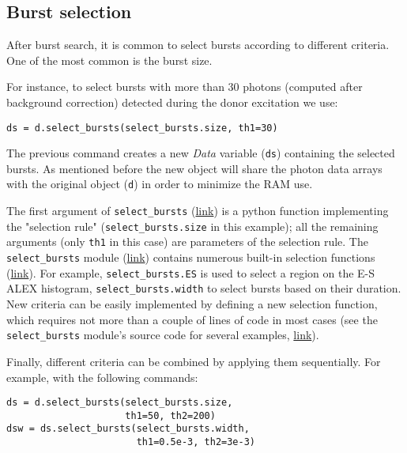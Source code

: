 \subsection{Burst selection}
\label{sec:burstsel}

After burst search, it is common to select bursts according to different
criteria. One of the most common is the burst size.

For instance, to select bursts with more than 30 photons (computed
after background correction) detected during the donor excitation
we use:

\begin{lstlisting}
ds = d.select_bursts(select_bursts.size, th1=30)
\end{lstlisting}

The previous command creates a new \textit{Data} variable (\verb|ds|) containing
the selected bursts.
As mentioned before the new object will share the photon data
arrays with the original object (\verb|d|) in order to minimize the RAM use.

The first argument of \verb|select_bursts| 
(\href{http://fretbursts.readthedocs.org/en/latest/data_class.html#burst-selection-methods}{link})
is a python function implementing the "selection rule" (\verb|select_bursts.size| in this example);
all the remaining arguments (only \verb|th1| in this case) are parameters of the selection rule.
The \verb|select_bursts| module 
(\href{http://fretbursts.readthedocs.org/en/latest/burst_selection.html}{link})
contains numerous built-in selection functions
(\href{http://fretbursts.readthedocs.org/en/latest/burst_selection.html#module-fretbursts.select_bursts}{link}).
For example,
\verb|select_bursts.ES|
is used to select a region on the E-S ALEX histogram,
\verb|select_bursts.width|
to select bursts based on their duration.
New criteria can be easily implemented by defining a new selection function,
which requires not more than a couple of lines of code in most cases (see the
\verb|select_bursts| module's source code
for several examples, 
\href{https://github.com/tritemio/FRETBursts/blob/master/fretbursts/select\_bursts.py}{link}).

Finally, different criteria can be combined by applying them sequentially.
For example, with the following commands:

\begin{lstlisting}
ds = d.select_bursts(select_bursts.size,
                     th1=50, th2=200)
dsw = ds.select_bursts(select_bursts.width,
                       th1=0.5e-3, th2=3e-3)
\end{lstlisting}

